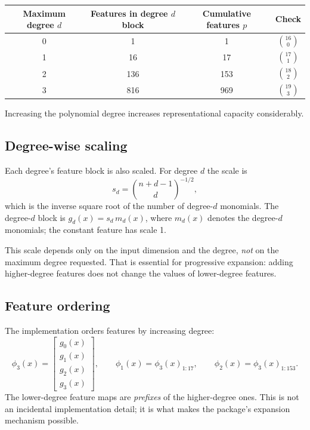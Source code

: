 \documentclass[11pt,a4paper]{article}
\begin{document}
\begin{center}
\begin{tabular}{@{}cccc@{}}
\toprule
Maximum degree $d$ & Features in degree $d$ block & Cumulative features $p$ & Check\\
\midrule
0 & 1 & 1 & $\binom{16}{0}$\\
1 & 16 & 17 & $\binom{17}{1}$\\
2 & 136 & 153 & $\binom{18}{2}$\\
3 & 816 & 969 & $\binom{19}{3}$\\
\bottomrule
\end{tabular}
\end{center}

Increasing the polynomial degree increases representational capacity considerably.

\subsection{Degree-wise scaling}\label{sec:scaling}

Each degree's feature block is also scaled. For degree $d$ the scale is
\[
s_d=\binom{n+d-1}{d}^{-1/2},
\]
which is the inverse square root of the number of degree-$d$ monomials. The degree-$d$ block is $g_d(x)=s_d\,m_d(x)$, where $m_d(x)$ denotes the degree-$d$ monomials; the constant feature has scale 1.

This scale depends only on the input dimension and the degree, \emph{not} on the maximum degree requested. That is essential for progressive expansion: adding higher-degree features does not change the values of lower-degree features.

\subsection{Feature ordering}

The implementation orders features by increasing degree:
\[
\phi_3(x)=\begin{bmatrix}g_0(x)\\g_1(x)\\g_2(x)\\g_3(x)\end{bmatrix},
\qquad
\phi_1(x)=\phi_3(x)_{1:17},
\qquad
\phi_2(x)=\phi_3(x)_{1:153}.
\]
The lower-degree feature maps are \emph{prefixes} of the higher-degree ones. This is not an incidental implementation detail; it is what makes the package's expansion mechanism possible.

\end{document}

